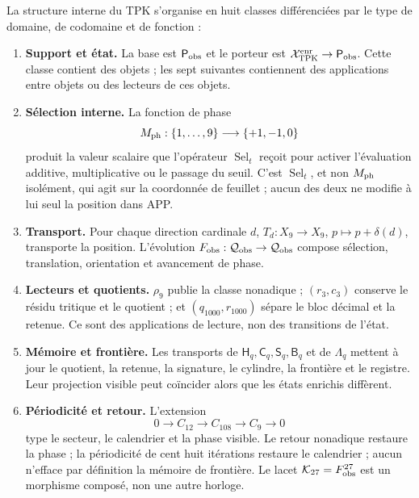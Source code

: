 \begin{definition}
\label{def:categorias-operatorias-tpk-rev11}
La structure interne du TPK s'organise en huit classes différenciées par le type de
domaine, de codomaine et de fonction :
\begin{enumerate}
 \item \textbf{Support et état.} La base est \(\mathsf P_{\rm obs}\) et le
 porteur est \(\mathcal X_{\rm TPK}^{\rm enr}\to\mathsf P_{\rm obs}\). Cette
 classe contient des objets ; les sept suivantes contiennent des applications entre objets
 ou des lecteurs de ces objets.
 \item \textbf{Sélection interne.} La fonction de phase
 \[
 M_{\rm ph}:\{1,\ldots,9\}\longrightarrow\{+1,-1,0\}
 \]
 produit la valeur scalaire que l'opérateur
 \(\operatorname{Sel}_t\) reçoit pour activer l'évaluation additive,
 multiplicative ou le passage du seuil. C'est \(\operatorname{Sel}_t\), et non
 \(M_{\rm ph}\) isolément, qui agit sur la coordonnée de feuillet ; aucun
 des deux ne modifie à lui seul la position dans APP.
 \item \textbf{Transport.} Pour chaque direction cardinale \(d\),
 \(T_d:X_9\to X_9\), \(p\mapsto p+\delta(d)\), transporte la position.
 L'évolution \(F_{\rm obs}:\mathcal Q_{\rm obs}\to\mathcal Q_{\rm obs}\)
 compose sélection, translation, orientation et avancement de phase.
 \item \textbf{Lecteurs et quotients.} \(\rho_9\) publie la classe nonadique ;
 \((r_3,c_3)\) conserve le résidu tritique et le quotient ; et
 \((q_{1000},r_{1000})\) sépare le bloc décimal et la retenue. Ce sont des applications de
 lecture, non des transitions de l'état.
 \item \textbf{Mémoire et frontière.} Les transports de
 \(\mathsf H_q,\mathsf C_q,\mathsf S_q,\mathsf B_q\) et de
 \(\mathsf\Lambda_q\) mettent à jour le quotient, la retenue, la signature, le cylindre, la frontière
 et le registre. Leur projection visible peut coïncider alors que les états
 enrichis diffèrent.
 \item \textbf{Périodicité et retour.} L'extension
 \[
 0\longrightarrow C_{12}\longrightarrow C_{108}
 \longrightarrow C_9\longrightarrow0
 \]
 type le secteur, le calendrier et la phase visible. Le retour nonadique restaure la
 phase ; la périodicité de cent huit itérations restaure le calendrier ;
 aucun n'efface
 par définition la mémoire de frontière. Le lacet
 \(\mathcal K_{27}=F_{\rm obs}^{27}\) est un morphisme composé, non une autre
 horloge.

\end{enumerate}
\end{definition}
